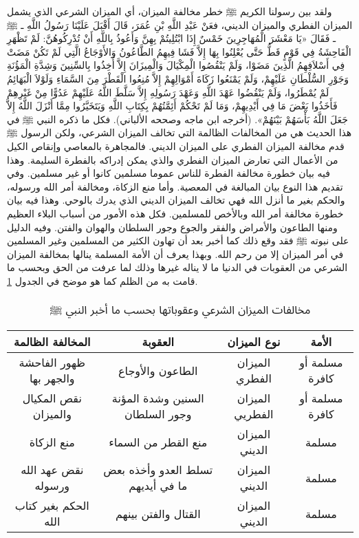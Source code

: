 ولقد بين رسولنا الكريم ﷺ خطر مخالفة الميزان، أي الميزان الشرعي الذي يشمل الميزان الفطري والميزان الديني، فعَنْ عَبْدِ اللَّهِ بْنِ عُمَرَ، قَالَ أَقْبَلَ عَلَيْنَا رَسُولُ اللَّهِ ـ ﷺ ـ فَقَالَ «يَا مَعْشَرَ الْمُهَاجِرِينَ خَمْسٌ إِذَا ابْتُلِيتُمْ بِهِنَّ وَأَعُوذُ بِاللَّهِ أَنْ تُدْرِكُوهُنَّ: لَمْ تَظْهَرِ الْفَاحِشَةُ فِي قَوْمٍ قَطُّ حَتَّى يُعْلِنُوا بِهَا إِلاَّ فَشَا فِيهِمُ الطَّاعُونُ وَالأَوْجَاعُ الَّتِي لَمْ تَكُنْ مَضَتْ فِي أَسْلاَفِهِمُ الَّذِينَ مَضَوْا، وَلَمْ يَنْقُصُوا الْمِكْيَالَ وَالْمِيزَانَ إِلاَّ أُخِذُوا بِالسِّنِينَ وَشِدَّةِ الْمَؤُنَةِ وَجَوْرِ السُّلْطَانِ عَلَيْهِمْ، وَلَمْ يَمْنَعُوا زَكَاةَ أَمْوَالِهِمْ إِلاَّ مُنِعُوا الْقَطْرَ مِنَ السَّمَاءِ وَلَوْلاَ الْبَهَائِمُ لَمْ يُمْطَرُوا، وَلَمْ يَنْقُضُوا عَهْدَ اللَّهِ وَعَهْدَ رَسُولِهِ إِلاَّ سَلَّطَ اللَّهُ عَلَيْهِمْ عَدُوًّا مِنْ غَيْرِهِمْ فَأَخَذُوا بَعْضَ مَا فِي أَيْدِيهِمْ، وَمَا لَمْ تَحْكُمْ أَئِمَّتُهُمْ بِكِتَابِ اللَّهِ وَيَتَخَيَّرُوا مِمَّا أَنْزَلَ اللَّهُ إِلاَّ جَعَلَ اللَّهُ بَأْسَهُمْ بَيْنَهُمْ».
{\footnotesize (أخرجه ابن ماجه وصححه الألباني)}.
فكل ما ذكره النبي ﷺ في هذا الحديث هي من المخالفات الظالمة التي تخالف الميزان الشرعي، ولكن الرسول ﷺ قدم مخالفة الميزان الفطري على الميزان الديني. فالمجاهرة بالمعاصي وإنقاص الكيل من الأعمال التي تعارض الميزان الفطري والذي يمكن إدراكه بالفطرة السليمة. وهذا فيه بيان خطورة مخالفة الفطرة للناس عموما مسلمين كانوا أو غير مسلمين. وفي تقديم هذا النوع بيان المبالغة في المعصية. وأما منع الزكاة، ومخالفة أمر الله ورسوله، والحكم بغير ما أنزل الله فهي تخالف الميزان الديني الذي يدرك بالوحي. وهذا فيه بيان خطورة مخالفة أمر الله وبالأخص للمسلمين. فكل هذه الأمور من أسباب البلاء العظيم ومنها الطاعون والأمراض والفقر والجوع وجور السلطان والهوان والفتن. وفيه الدليل على نبوته ﷺ فقد وقع ذلك كما أخبر بعد أن تهاون الكثير من المسلمين وغير المسلمين في أمر الميزان إلا من رحم الله. وبهذا يعرف أن الأمة المسلمة ينالها بمخالفة الميزان الشرعي من العقوبات في الدنيا ما لا يناله غيرها وذلك لما عرفت من الحق وبحسب ما قامت به من الظلم كما هو موضح في الجدول \ref{tab:violations}. 

\begin{table}[h]
\centering
\begin{tabular}{|c|c|c|c|}
\hline
\textbf{المخالفة الظالمة} & \textbf{العقوبة} & \textbf{نوع الميزان} & \textbf{الأمة}  \\
\hline
ظهور الفاحشة والجهر بها & الطاعون والأوجاع & الميزان الفطري & مسلمة أو كافرة \\
\hline
نقص المكيال والميزان & السنين وشدة المؤنة وجور السلطان & الميزان الفطريي & مسلمة أو كافرة \\
\hline
منع الزكاة & منع القطر من السماء  & الميزان الديني & مسلمة \\
\hline
نقض عهد الله ورسوله & تسلط العدو وأخذه بعض ما في أيديهم & الميزان الديني & مسلمة \\
\hline
الحكم بغير كتاب الله & القتال والفتن بينهم & الميزان الديني & مسلمة \\
\hline
\end{tabular}
\caption{مخالفات الميزان الشرعي وعقوباتها بحسب ما أخبر النبي ﷺ}
\label{tab:violations}
\end{table}

